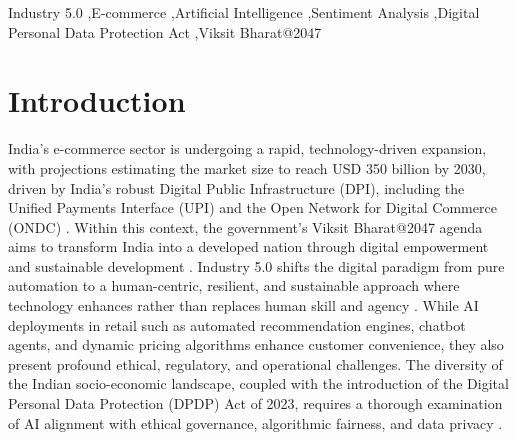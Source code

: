 \documentclass[authoryear,review,3p,times,12pt]{elsarticle}
\begin{document}
\begin{frontmatter}


\begin{keyword}
Industry 5.0 \sep E-commerce \sep Artificial Intelligence \sep Sentiment Analysis \sep Digital Personal Data Protection Act \sep Viksit Bharat@2047
\end{keyword}

\end{frontmatter}



\section{Introduction}
\label{sec:intro}
India's e-commerce sector is undergoing a rapid, technology-driven expansion, with projections estimating the market size to reach USD 350 billion by 2030, driven by India's robust Digital Public Infrastructure (DPI), including the Unified Payments Interface (UPI) and the Open Network for Digital Commerce (ONDC) \citep{RAHMAN2026100020}. Within this context, the government's Viksit Bharat@2047 agenda aims to transform India into a developed nation through digital empowerment and sustainable development \citep{nitiaayog2026dpi}. Industry 5.0 shifts the digital paradigm from pure automation to a human-centric, resilient, and sustainable approach where technology enhances rather than replaces human skill and agency \citep{TOTH2023102260, martini16135448}. While AI deployments in retail such as automated recommendation engines, chatbot agents, and dynamic pricing algorithms enhance customer convenience, they also present profound ethical, regulatory, and operational challenges. The diversity of the Indian socio-economic landscape, coupled with the introduction of the Digital Personal Data Protection (DPDP) Act of 2023, requires a thorough examination of AI alignment with ethical governance, algorithmic fairness, and data privacy \citep{Sundara2023129141, Naithani20240174}.
\end{document}
